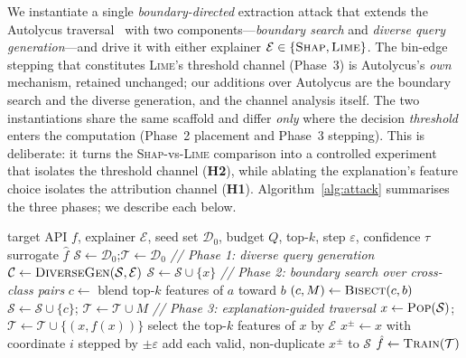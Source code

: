 \documentclass[sigconf,anonymous,review]{acmart}
\begin{document}
We instantiate a single \emph{boundary-directed} extraction attack that extends the
Autolycus traversal~\cite{oksuz2024autolycus} with two components---\emph{boundary
search} and \emph{diverse query generation}---and drive it with either explainer
$\mathcal{E} \in \{\textsc{Shap}, \textsc{Lime}\}$. The bin-edge stepping that constitutes
\textsc{Lime}'s threshold channel (Phase~3) is Autolycus's \emph{own} mechanism, retained
unchanged; our additions over Autolycus are the boundary search and the diverse generation, and the
channel analysis itself. The two instantiations share the
same scaffold and differ \emph{only} where the decision \emph{threshold} enters the
computation (Phase~2 placement and Phase~3 stepping). This is deliberate: it turns the
\textsc{Shap}-vs-\textsc{Lime} comparison into a controlled experiment that isolates
the threshold channel (\textbf{H2}), while ablating the explanation's feature choice
isolates the attribution channel (\textbf{H1}). Algorithm~\ref{alg:attack} summarises
the three phases; we describe each below.

\begin{algorithm}[t]
\caption{Boundary-directed explanation-guided extraction, instantiated with explainer
$\mathcal{E}\in\{\textsc{Shap},\textsc{Lime}\}$.}
\label{alg:attack}
\begin{algorithmic}[1]
\Require target API $f$, explainer $\mathcal{E}$, seed set $\mathcal{D}_0$, budget $Q$,
top-$k$, step $\varepsilon$, confidence $\tau$
\Ensure surrogate $\hat{f}$
\State $\mathcal{S} \gets \mathcal{D}_0$;\quad $\mathcal{T} \gets \mathcal{D}_0$
\Statex \textit{// Phase 1: diverse query generation}
\State $\mathcal{C} \gets \textsc{DiverseGen}(\mathcal{S}, \mathcal{E})$
   \State $\mathcal{S} \gets \mathcal{S} \cup \{x\}$
  \EndIf
\EndFor
\Statex \textit{// Phase 2: boundary search over cross-class pairs}
  \State $c \gets$ blend top-$k$ features of $a$ toward $b$
  \State $(c, M) \gets \textsc{Bisect}(c, b)$ 
  \State $\mathcal{S} \gets \mathcal{S} \cup \{c\}$;\quad
         $\mathcal{T} \gets \mathcal{T} \cup M$ 
\EndFor
\Statex \textit{// Phase 3: explanation-guided traversal}
  \State $x \gets \textsc{Pop}(\mathcal{S})$;\quad
         $\mathcal{T} \gets \mathcal{T} \cup \{(x, f(x))\}$
  \State select the top-$k$ features of $x$ by $\mathcal{E}$
     \State $x^{\pm} \gets x$ with coordinate $i$ stepped by $\pm\varepsilon$
     \State add each valid, non-duplicate $x^{\pm}$ to $\mathcal{S}$
  \EndFor
\EndWhile
\State \Return $\hat{f} \gets \textsc{Train}(\mathcal{T})$
\end{algorithmic}
\end{algorithm}
\end{document}
